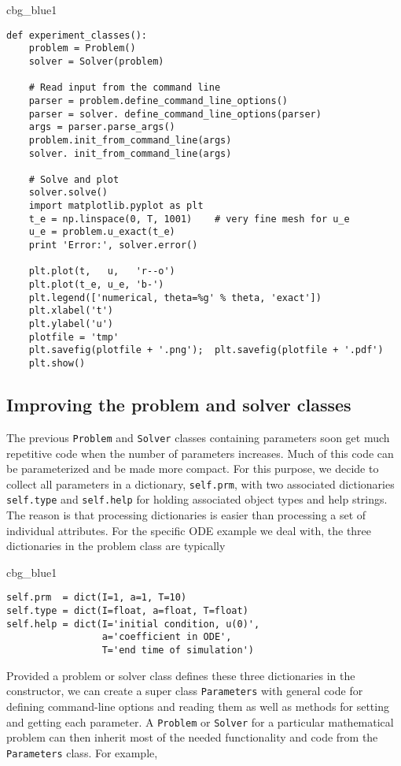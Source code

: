\documentclass[graybox,sectrefs,envcountresetchap,open=right,final]{svmonodo}
\newenvironment{_cod_tight}[1]{
   \def\FrameCommand{\colorbox{#1}}
   \FrameRule0.6pt\MakeFramed {\FrameRestore}\vskip3mm}
   {\vskip0mm\endMakeFramed}
\newenvironment{cod}[1]{
\bgroup\rmfamily
\fboxsep=0mm\relax
\begin{_cod_tight}{#1}
\list{}{\parsep=-2mm\parskip=0mm\topsep=0pt\leftmargin=2mm
\rightmargin=2\leftmargin\leftmargin=4pt\relax}
\item\relax}
{\endlist\end{_cod_tight}\egroup}
\begin{document}
\begin{cod}{cbg_blue1}\begin{Verbatim}[numbers=none,fontsize=\fontsize{9pt}{9pt},baselinestretch=0.95,xleftmargin=2mm]
def experiment_classes():
    problem = Problem()
    solver = Solver(problem)

    # Read input from the command line
    parser = problem.define_command_line_options()
    parser = solver. define_command_line_options(parser)
    args = parser.parse_args()
    problem.init_from_command_line(args)
    solver. init_from_command_line(args)

    # Solve and plot
    solver.solve()
    import matplotlib.pyplot as plt
    t_e = np.linspace(0, T, 1001)    # very fine mesh for u_e
    u_e = problem.u_exact(t_e)
    print 'Error:', solver.error()

    plt.plot(t,   u,   'r--o')
    plt.plot(t_e, u_e, 'b-')
    plt.legend(['numerical, theta=%g' % theta, 'exact'])
    plt.xlabel('t')
    plt.ylabel('u')
    plotfile = 'tmp'
    plt.savefig(plotfile + '.png');  plt.savefig(plotfile + '.pdf')
    plt.show()
\end{Verbatim}
\end{cod}
\noindent


\subsection{Improving the problem and solver classes}
\label{softeng1:prog:se:class2}

The previous \texttt{Problem} and \texttt{Solver} classes containing parameters
soon get much repetitive code when the number of parameters increases.
Much of this code can be parameterized and be made more compact.
For this purpose, we decide to collect all parameters in a dictionary,
\texttt{self.prm}, with two associated dictionaries \texttt{self.type} and
\texttt{self.help} for holding associated object types and help strings.
The reason is that processing dictionaries is easier than processing
a set of individual attributes.
For the specific ODE example we deal with, the three dictionaries in
the problem class are typically

\begin{cod}{cbg_blue1}\begin{Verbatim}[numbers=none,fontsize=\fontsize{9pt}{9pt},baselinestretch=0.95,xleftmargin=2mm]
self.prm  = dict(I=1, a=1, T=10)
self.type = dict(I=float, a=float, T=float)
self.help = dict(I='initial condition, u(0)',
                 a='coefficient in ODE',
                 T='end time of simulation')
\end{Verbatim}
\end{cod}
\noindent
Provided a problem or solver class defines these three
dictionaries in the constructor,
we can create a super class \texttt{Parameters} with general code
for defining command-line options and reading them as well as
methods for setting and getting each parameter. A \texttt{Problem} or \texttt{Solver} for
a particular mathematical problem can then
inherit most of the needed functionality and code
from the \texttt{Parameters} class. For example,
\end{document}

